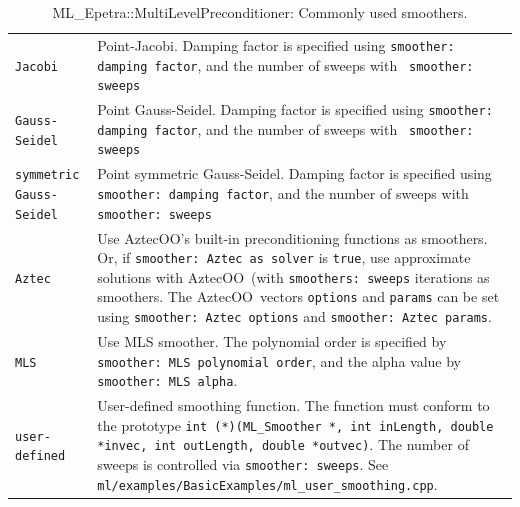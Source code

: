 \documentclass{article}[11pt]
\newcommand{\Aztecoo}  {{\sc AztecOO}}
\newcommand{\aztecoo}  {{\Aztecoo}}
\begin{document}
\begin{table}[tbh]
\begin{center}
\begin{tabular}{ | p{4cm} | p{10cm} | }
\hline
\verb!Jacobi! & Point-Jacobi. Damping factor is specified using
{\tt smoother: damping factor}, and the number of sweeps with {\tt
  smoother: sweeps} \\ 
\verb!Gauss-Seidel! & Point Gauss-Seidel.  Damping factor is specified using
{\tt smoother: damping factor}, and the number of sweeps with {\tt
  smoother: sweeps} \\
\verb!symmetric Gauss-Seidel! & Point symmetric Gauss-Seidel.  Damping factor is specified using
{\tt smoother: damping factor}, and the number of sweeps with {\tt
  smoother: sweeps} \\
\verb!Aztec! & Use \aztecoo's built-in preconditioning functions as
smoothers. Or, if {\tt smoother: Aztec as solver} is {\tt true},  use
approximate solutions with \aztecoo~(with {\tt smoothers: sweeps}
iterations as smoothers. 
The \aztecoo~vectors \verb!options! and {\tt params} can be set using
{\tt smoother: Aztec options} and {\tt smoother: Aztec params}. \\
\verb!MLS! & Use MLS smoother. The polynomial order is specified by {\tt
  \tt smoother: MLS polynomial order}, and the alpha value by {\tt
  smoother: MLS alpha}.\\ 
\verb!user-defined! & User-defined smoothing function.  The function must conform to
the prototype {\tt int (*)(ML\_Smoother *, int inLength, double *invec, int outLength,
 double *outvec)}. The number of sweeps is controlled via {\tt smoother: sweeps}. See
{\tt ml/examples/BasicExamples/ml\_user\_smoothing.cpp}.\\
\hline
\end{tabular}
\caption{ML\_Epetra::MultiLevelPreconditioner: Commonly used smoothers.} 
\label{tab:ml:smoother}
\end{center}
\end{table}
\end{document}
